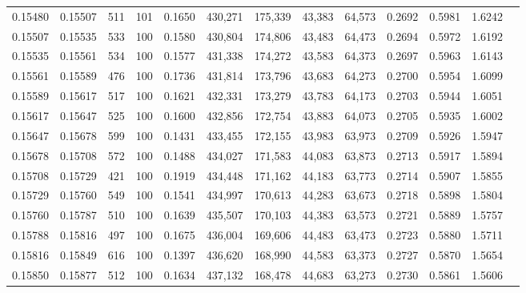 \begin{tabular}{rrrrrrrrrrrrr}
0.15480 & 0.15507 &   511 & 101 &                                     0.1650 & 430,271 & 175,339 &  43,383 &  64,573 & 0.2692 & 0.5981 & 1.6242 \\
0.15507 & 0.15535 &   533 & 100 &                                     0.1580 & 430,804 & 174,806 &  43,483 &  64,473 & 0.2694 & 0.5972 & 1.6192 \\
0.15535 & 0.15561 &   534 & 100 &                                     0.1577 & 431,338 & 174,272 &  43,583 &  64,373 & 0.2697 & 0.5963 & 1.6143 \\
0.15561 & 0.15589 &   476 & 100 &                                     0.1736 & 431,814 & 173,796 &  43,683 &  64,273 & 0.2700 & 0.5954 & 1.6099 \\
0.15589 & 0.15617 &   517 & 100 &                                     0.1621 & 432,331 & 173,279 &  43,783 &  64,173 & 0.2703 & 0.5944 & 1.6051 \\
0.15617 & 0.15647 &   525 & 100 &                                     0.1600 & 432,856 & 172,754 &  43,883 &  64,073 & 0.2705 & 0.5935 & 1.6002 \\
0.15647 & 0.15678 &   599 & 100 &                                     0.1431 & 433,455 & 172,155 &  43,983 &  63,973 & 0.2709 & 0.5926 & 1.5947 \\
0.15678 & 0.15708 &   572 & 100 &                                     0.1488 & 434,027 & 171,583 &  44,083 &  63,873 & 0.2713 & 0.5917 & 1.5894 \\
0.15708 & 0.15729 &   421 & 100 &                                     0.1919 & 434,448 & 171,162 &  44,183 &  63,773 & 0.2714 & 0.5907 & 1.5855 \\
0.15729 & 0.15760 &   549 & 100 &                                     0.1541 & 434,997 & 170,613 &  44,283 &  63,673 & 0.2718 & 0.5898 & 1.5804 \\
0.15760 & 0.15787 &   510 & 100 &                                     0.1639 & 435,507 & 170,103 &  44,383 &  63,573 & 0.2721 & 0.5889 & 1.5757 \\
0.15788 & 0.15816 &   497 & 100 &                                     0.1675 & 436,004 & 169,606 &  44,483 &  63,473 & 0.2723 & 0.5880 & 1.5711 \\
0.15816 & 0.15849 &   616 & 100 &                                     0.1397 & 436,620 & 168,990 &  44,583 &  63,373 & 0.2727 & 0.5870 & 1.5654 \\
0.15850 & 0.15877 &   512 & 100 &                                     0.1634 & 437,132 & 168,478 &  44,683 &  63,273 & 0.2730 & 0.5861 & 1.5606 \\

\end{tabular}
